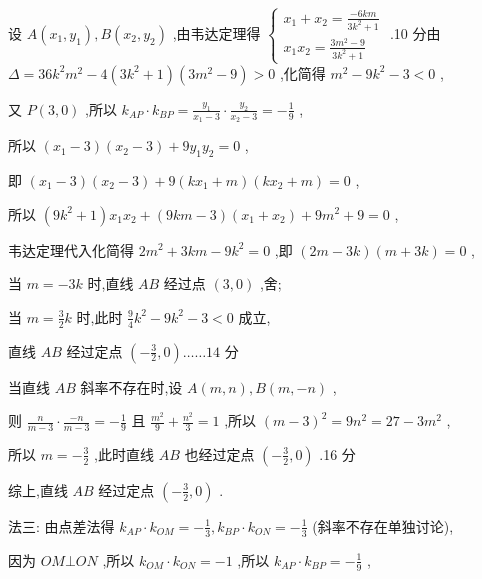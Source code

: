 \documentclass[10pt]{article}
\newcommand*\circled[1]{\tikz[baseline=(char.base)]{\node[shape=circle,draw,inner sep=1.5pt] (char) {\small #1};}}
\begin{document}
设 \(A\left( {{x}_{1},{y}_{1}}\right) ,B\left( {{x}_{2},{y}_{2}}\right)\) ,由韦达定理得 \(\left\{  \begin{array}{l} {x}_{1} + {x}_{2} = \frac{-{6km}}{3{k}^{2} + 1} \\  {x}_{1}{x}_{2} = \frac{3{m}^{2} - 9}{3{k}^{2} + 1} \end{array}\right.\) .10 分由 \(\Delta  = {36}{k}^{2}{m}^{2} - 4\left( {3{k}^{2} + 1}\right) \left( {3{m}^{2} - 9}\right)  > 0\) ,化简得 \({m}^{2} - 9{k}^{2} - 3 < 0\) ,

又 \(P\left( {3,0}\right)\) ,所以 \({k}_{AP} \cdot  {k}_{BP} = \frac{{y}_{1}}{{x}_{1} - 3} \cdot  \frac{{y}_{2}}{{x}_{2} - 3} =  - \frac{1}{9}\) ,

所以 \(\left( {{x}_{1} - 3}\right) \left( {{x}_{2} - 3}\right)  + 9{y}_{1}{y}_{2} = 0\) ,

即 \(\left( {{x}_{1} - 3}\right) \left( {{x}_{2} - 3}\right)  + 9\left( {k{x}_{1} + m}\right) \left( {k{x}_{2} + m}\right)  = 0\) ,

所以 \(\left( {9{k}^{2} + 1}\right) {x}_{1}{x}_{2} + \left( {{9km} - 3}\right) \left( {{x}_{1} + {x}_{2}}\right)  + 9{m}^{2} + 9 = 0\) ,

韦达定理代入化简得 \(2{m}^{2} + {3km} - 9{k}^{2} = 0\) ,即 \(\left( {{2m} - {3k}}\right) \left( {m + {3k}}\right)  = 0\) ,

当 \(m =  - {3k}\) 时,直线 \({AB}\) 经过点 \(\left( {3,0}\right)\) ,舍;

当 \(m = \frac{3}{2}k\) 时,此时 \(\frac{9}{4}{k}^{2} - 9{k}^{2} - 3 < 0\) 成立,

直线 \({AB}\) 经过定点 \(\left( {-\frac{3}{2},0}\right) \ldots \ldots {14}\) 分

 \circled{2} 当直线 \({AB}\) 斜率不存在时,设 \(A\left( {m,n}\right) ,B\left( {m, - n}\right)\) ,

则 \(\frac{n}{m - 3} \cdot  \frac{-n}{m - 3} =  - \frac{1}{9}\) 且 \(\frac{{m}^{2}}{9} + \frac{{n}^{2}}{3} = 1\) ,所以 \({\left( m - 3\right) }^{2} = 9{n}^{2} = {27} - 3{m}^{2}\) ,

所以 \(m =  - \frac{3}{2}\) ,此时直线 \({AB}\) 也经过定点 \(\left( {-\frac{3}{2},0}\right)\) .16 分

综上,直线 \({AB}\) 经过定点 \(\left( {-\frac{3}{2},0}\right)\) .

法三: 由点差法得 \({k}_{AP} \cdot  {k}_{OM} =  - \frac{1}{3},{k}_{BP} \cdot  {k}_{ON} =  - \frac{1}{3}\) (斜率不存在单独讨论),

因为 \({OM} \bot  {ON}\) ,所以 \({k}_{OM} \cdot  {k}_{ON} =  - 1\) ,所以 \({k}_{AP} \cdot  {k}_{BP} =  - \frac{1}{9}\) ,
\end{document}
